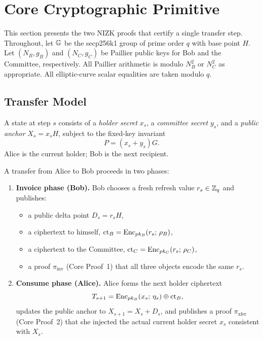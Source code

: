 \section{Core Cryptographic Primitive}\label{sec:coreproof}

This section presents the two NIZK proofs that certify a single \thunderbolt transfer step. Throughout, let $\mathbb{G}$ be the secp256k1 group of prime order $q$ with base point $H$. Let $(N_B, g_B)$ and $(N_C, g_C)$ be Paillier public keys for Bob and the Committee, respectively. All Paillier arithmetic is modulo $N_B^2$ or $N_C^2$ as appropriate. All elliptic-curve scalar equalities are taken modulo $q$.

\subsection{Transfer Model}\label{sec:transfer-model}

A \thunderbolt state at step $s$ consists of a \emph{holder secret} $x_s$, a \emph{committee secret} $y_s$, and a \emph{public anchor} $X_s = x_s H$, subject to the fixed-key invariant
\begin{equation}\label{eq:invariant}
P = (x_s + y_s) G.
\end{equation}
Alice is the current holder; Bob is the next recipient.

A transfer from Alice to Bob proceeds in two phases:

\begin{enumerate}
  \item \textbf{Invoice phase (Bob).} Bob chooses a fresh refresh value $r_s \in \mathbb{Z}_q$ and publishes:
  \begin{itemize}
    \item a public delta point $D_s = r_s H$,
    \item a ciphertext to himself, $\mathrm{ct}_B = \mathrm{Enc}_{pk_B}(r_s;\, \rho_B)$,
    \item a ciphertext to the Committee, $\mathrm{ct}_C = \mathrm{Enc}_{pk_C}(r_s;\, \rho_C)$,
    \item a proof $\pi_{\mathrm{inv}}$ (Core Proof~1) that all three objects encode the same $r_s$.
  \end{itemize}

  \item \textbf{Consume phase (Alice).} Alice forms the next holder ciphertext
  $$
  T_{s+1} = \mathrm{Enc}_{pk_B}(x_s;\, \eta_s) \oplus \mathrm{ct}_B,
  $$
  updates the public anchor to $X_{s+1} = X_s + D_s$, and publishes a proof $\pi_{\mathrm{xfer}}$ (Core Proof~2) that she injected the actual current holder secret $x_s$ consistent with $X_s$.
\end{enumerate}

